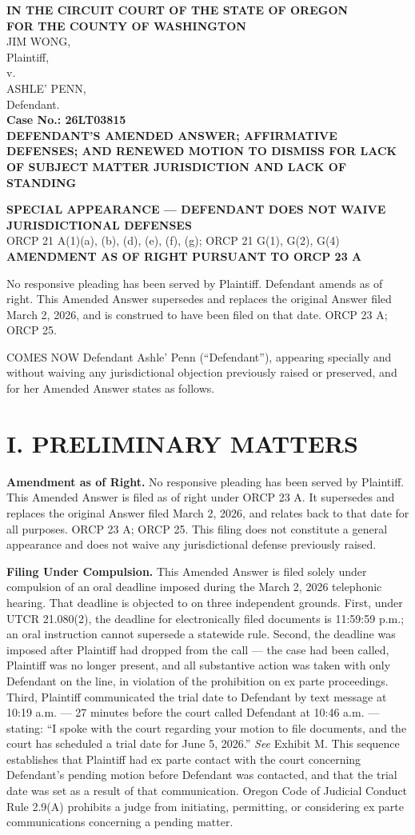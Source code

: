 \documentclass[12pt,letterpaper]{article}
\newcommand{\oregoncaption}[5]{%
	\noindent
	\textbf{IN THE CIRCUIT COURT OF THE STATE OF OREGON} \\
	\textbf{FOR THE COUNTY OF #1} \\
	\vspace{0.2in}
	\noindent #2, \\
	\quad Plaintiff, \\
	v. \\
	#3, \\
	\quad Defendant. \\
	\vspace{0.1in}
	\noindent \textbf{Case No.: #4} \\
	\vspace{0.1in}
	\noindent \textbf{#5} \\
	\vspace{0.1in}
}
\begin{document}
	
	\oregoncaption{WASHINGTON}{JIM WONG}{ASHLE' PENN}{26LT03815}{DEFENDANT'S AMENDED ANSWER; AFFIRMATIVE DEFENSES; AND RENEWED MOTION TO DISMISS FOR LACK OF SUBJECT MATTER JURISDICTION AND LACK OF STANDING}
	
	\begin{center}
		\textbf{SPECIAL APPEARANCE --- DEFENDANT DOES NOT WAIVE JURISDICTIONAL DEFENSES} \\
		ORCP 21 A(1)(a), (b), (d), (e), (f), (g); ORCP 21 G(1), G(2), G(4) \\
		\textbf{AMENDMENT AS OF RIGHT PURSUANT TO ORCP 23 A}
	\end{center}
	
	No responsive pleading has been served by Plaintiff. Defendant amends as of right. This Amended Answer supersedes and replaces the original Answer filed March 2, 2026, and is construed to have been filed on that date. ORCP 23 A; ORCP 25.
	
	COMES NOW Defendant Ashle' Penn (``Defendant''), appearing specially and without waiving any jurisdictional objection previously raised or preserved, and for her Amended Answer states as follows.
	
	\section*{I. PRELIMINARY MATTERS}
	
	\textbf{Amendment as of Right.} No responsive pleading has been served by Plaintiff. This Amended Answer is filed as of right under ORCP 23 A. It supersedes and replaces the original Answer filed March 2, 2026, and relates back to that date for all purposes. ORCP 23 A; ORCP 25. This filing does not constitute a general appearance and does not waive any jurisdictional defense previously raised.
	
	\textbf{Filing Under Compulsion.} This Amended Answer is filed solely under compulsion of an oral deadline imposed during the March 2, 2026 telephonic hearing. That deadline is objected to on three independent grounds. First, under UTCR 21.080(2), the deadline for electronically filed documents is 11:59:59 p.m.; an oral instruction cannot supersede a statewide rule. Second, the deadline was imposed after Plaintiff had dropped from the call --- the case had been called, Plaintiff was no longer present, and all substantive action was taken with only Defendant on the line, in violation of the prohibition on ex parte proceedings. Third, Plaintiff communicated the trial date to Defendant by text message at 10:19 a.m. --- 27 minutes before the court called Defendant at 10:46 a.m. --- stating: ``I spoke with the court regarding your motion to file documents, and the court has scheduled a trial date for June 5, 2026.'' \textit{See} Exhibit M. This sequence establishes that Plaintiff had ex parte contact with the court concerning Defendant's pending motion before Defendant was contacted, and that the trial date was set as a result of that communication. Oregon Code of Judicial Conduct Rule 2.9(A) prohibits a judge from initiating, permitting, or considering ex parte communications concerning a pending matter.
	
\end{document}
